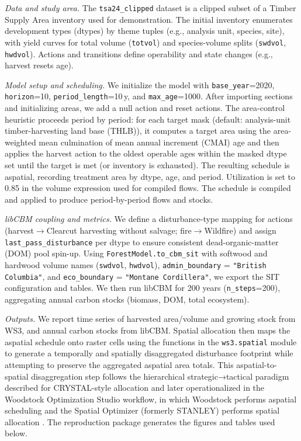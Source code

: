 \documentclass[review]{elsarticle}
\begin{document}
\emph{Data and study area.} The \texttt{tsa24\_clipped} dataset is a clipped subset of a Timber Supply Area inventory used for demonstration. The initial inventory enumerates development types (dtypes) by theme tuples (e.g., analysis unit, species, site), with yield curves for total volume (\texttt{totvol}) and species-volume splits (\texttt{swdvol}, \texttt{hwdvol}). Actions and transitions define operability and state changes (e.g., harvest resets age).

\emph{Model setup and scheduling.} We initialize the model with \texttt{base\_year}=2020, \texttt{horizon}=10, \texttt{period\_length}=10\,y, and \texttt{max\_age}=1000. After importing sections and initializing areas, we add a null action and reset actions. The area-control heuristic proceeds period by period: for each target mask (default: analysis-unit timber-harvesting land base (THLB)), it computes a target area using the area-weighted mean culmination of mean annual increment (CMAI) age and then applies the harvest action to the oldest operable ages within the masked dtype set until the target is met (or inventory is exhausted). The resulting schedule is aspatial, recording treatment area by dtype, age, and period. Utilization is set to 0.85 in the volume expression used for compiled flows. The schedule is compiled and applied to produce period-by-period flows and stocks.

\emph{libCBM coupling and metrics.} We define a disturbance-type mapping for actions (harvest$\to$Clearcut harvesting without salvage; fire$\to$Wildfire) and assign \texttt{last\_pass\_disturbance} per dtype to ensure consistent dead-organic-matter (DOM) pool spin-up. Using \texttt{ForestModel.to\_cbm\_sit} with softwood and hardwood volume names (\texttt{swdvol}, \texttt{hwdvol}), \texttt{admin\_boundary} = \texttt{"British Columbia"}, and \texttt{eco\_boundary} = \texttt{"Montane Cordillera"}, we export the SIT configuration and tables. We then run libCBM for 200 years (\texttt{n\_steps}=200), aggregating annual carbon stocks (biomass, DOM, total ecosystem).

\emph{Outputs.} We report time series of harvested area/volume and growing stock from WS3, and annual carbon stocks from libCBM. Spatial allocation then maps the aspatial schedule onto raster cells using the functions in the \texttt{ws3.spatial} module to generate a temporally and spatially disaggregated disturbance footprint while attempting to preserve the aggregated aspatial area totals. This aspatial-to-spatial disaggregation step follows the hierarchical strategic→tactical paradigm described for CRYSTAL-style allocation \citep{jamnick1993spatial} and later operationalized in the Woodstock Optimization Studio workflow, in which Woodstock performs aspatial scheduling and the Spatial Optimizer (formerly STANLEY) performs spatial allocation \citep{feunekes1997hierarchical, mistik2019modeling}. The reproduction package generates the figures and tables used below.
\end{document}
